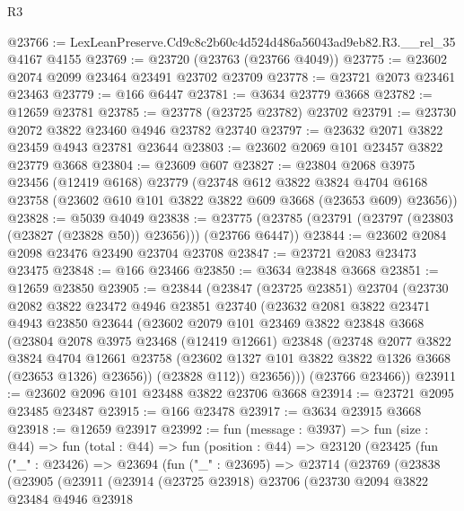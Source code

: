 \begin{lexlean}{R3}
\begin{coremodule}
@23766 := LexLeanPreserve.Cd9c8c2b60c4d524d486a56043ad9eb82.R3.__rel_35 @4167 @4155
@23769 := @23720 (@23763 (@23766 @4049))
@23775 := @23602 @2074 @2099 @23464 @23491 @23702 @23709
@23778 := @23721 @2073 @23461 @23463
@23779 := @166 @6447
@23781 := @3634 @23779 @3668
@23782 := @12659 @23781
@23785 := @23778 (@23725 @23782) @23702
@23791 := @23730 @2072 @3822 @23460 @4946 @23782 @23740
@23797 := @23632 @2071 @3822 @23459 @4943 @23781 @23644
@23803 := @23602 @2069 @101 @23457 @3822 @23779 @3668
@23804 := @23609 @607
@23827 := @23804
    @2068
    @3975
    @23456
    (@12419 @6168)
    @23779
    (@23748
      @612
      @3822
      @3824
      @4704
      @6168
      @23758
      (@23602 @610 @101 @3822 @3822 @609 @3668 (@23653 @609) @23656))
@23828 := @5039 @4049
@23838 := @23775 (@23785 (@23791 (@23797 (@23803 (@23827 (@23828 @50)) @23656))) (@23766 @6447))
@23844 := @23602 @2084 @2098 @23476 @23490 @23704 @23708
@23847 := @23721 @2083 @23473 @23475
@23848 := @166 @23466
@23850 := @3634 @23848 @3668
@23851 := @12659 @23850
@23905 := @23844
    (@23847
      (@23725 @23851)
      @23704
      (@23730
        @2082
        @3822
        @23472
        @4946
        @23851
        @23740
        (@23632
          @2081
          @3822
          @23471
          @4943
          @23850
          @23644
          (@23602
            @2079
            @101
            @23469
            @3822
            @23848
            @3668
            (@23804
              @2078
              @3975
              @23468
              (@12419 @12661)
              @23848
              (@23748
                @2077
                @3822
                @3824
                @4704
                @12661
                @23758
                (@23602 @1327 @101 @3822 @3822 @1326 @3668 (@23653 @1326) @23656))
              (@23828 @112))
            @23656)))
      (@23766 @23466))
@23911 := @23602 @2096 @101 @23488 @3822 @23706 @3668
@23914 := @23721 @2095 @23485 @23487
@23915 := @166 @23478
@23917 := @3634 @23915 @3668
@23918 := @12659 @23917
@23992 := fun (message : @3937) =>
  fun (size : @44) =>
  fun (total : @44) =>
  fun (position : @44) =>
  @23120
    (@23425
      (fun ("_" : @23426) =>
      @23694
        (fun ("_" : @23695) =>
        @23714
          (@23769
            (@23838
              (@23905
                (@23911
                  (@23914
                    (@23725 @23918)
                    @23706
                    (@23730
                      @2094
                      @3822
                      @23484
                      @4946
                      @23918

\end{coremodule}
\end{lexlean}
